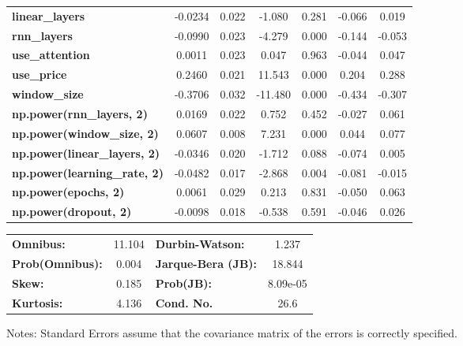 \begin{center}
\begin{tabular}{lcccccc}
\textbf{linear\_layers}              &      -0.0234  &        0.022     &    -1.080  &         0.281        &       -0.066    &        0.019     \\
\textbf{rnn\_layers}                 &      -0.0990  &        0.023     &    -4.279  &         0.000        &       -0.144    &       -0.053     \\
\textbf{use\_attention}              &       0.0011  &        0.023     &     0.047  &         0.963        &       -0.044    &        0.047     \\
\textbf{use\_price}                  &       0.2460  &        0.021     &    11.543  &         0.000        &        0.204    &        0.288     \\
\textbf{window\_size}                &      -0.3706  &        0.032     &   -11.480  &         0.000        &       -0.434    &       -0.307     \\
\textbf{np.power(rnn\_layers, 2)}    &       0.0169  &        0.022     &     0.752  &         0.452        &       -0.027    &        0.061     \\
\textbf{np.power(window\_size, 2)}   &       0.0607  &        0.008     &     7.231  &         0.000        &        0.044    &        0.077     \\
\textbf{np.power(linear\_layers, 2)} &      -0.0346  &        0.020     &    -1.712  &         0.088        &       -0.074    &        0.005     \\
\textbf{np.power(learning\_rate, 2)} &      -0.0482  &        0.017     &    -2.868  &         0.004        &       -0.081    &       -0.015     \\
\textbf{np.power(epochs, 2)}         &       0.0061  &        0.029     &     0.213  &         0.831        &       -0.050    &        0.063     \\
\textbf{np.power(dropout, 2)}        &      -0.0098  &        0.018     &    -0.538  &         0.591        &       -0.046    &        0.026     \\
\bottomrule
\end{tabular}
\begin{tabular}{lclc}
\textbf{Omnibus:}       & 11.104 & \textbf{  Durbin-Watson:     } &    1.237  \\
\textbf{Prob(Omnibus):} &  0.004 & \textbf{  Jarque-Bera (JB):  } &   18.844  \\
\textbf{Skew:}          &  0.185 & \textbf{  Prob(JB):          } & 8.09e-05  \\
\textbf{Kurtosis:}      &  4.136 & \textbf{  Cond. No.          } &     26.6  \\
\bottomrule
\end{tabular}
\end{center}

Notes: \newline
 [1] Standard Errors assume that the covariance matrix of the errors is correctly specified.
